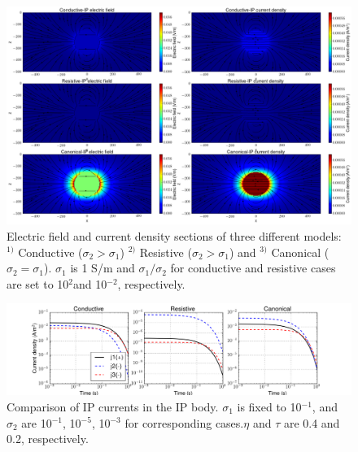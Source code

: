 \documentclass[a4paper, 11pt]{article}
\begin{document}
\begin{figure}[htb]
  \centering
  \includegraphics[width=1.0\textwidth]{DCEJIP.png}
  \caption{Electric field and current density sections of three different models: $^{1)}$ Conductive ($\sigma_2 > \sigma_1$) $^{2)}$ Resistive ($\sigma_2 > \sigma_1$) and $^{3)}$ Canonical ($\sigma_2 = \sigma_1$). $\sigma_1$ is 1 S/m and $\sigma_1 / \sigma_2$ for conductive and resistive cases are set to 10$^{2}$and 10$^{-2}$, respectively. }
  \label{fig:DCEJIP}
\end{figure}

\begin{figure}[htb]
  \centering
  \includegraphics[width=1.0\textwidth]{jipcurves.png}
  \caption{Comparison of IP currents in the IP body. $\sigma_1$ is fixed to 10$^{-1}$, and $\sigma_2$ are 10$^{-1}$, 10$^{-5}$, 10$^{-3}$ for corresponding cases.$\eta$ and $\tau$ are 0.4 and 0.2, respectively.}
  \label{fig:jipcurves}
\end{figure}

\clearpage
\end{document}
